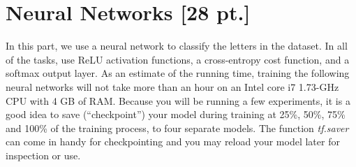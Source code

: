 \documentclass[12pt,letterpaper]{article}
\begin{document}
\section{Neural Networks [28 pt.]}

In this part, we use a neural network to classify the letters in the dataset. In all of the tasks, use ReLU activation functions, a cross-entropy cost function, and a softmax output layer. As an estimate of the running time, training the following neural networks will not take more than an hour on an Intel core i7 1.73-GHz CPU with 4 GB of RAM. Because you will be running a few experiments, it is a good idea to save (``checkpoint'') your model during training at 25\%, 50\%, 75\% and 100\% of the training process, to four separate models. The function \textit{tf.saver} can come in handy for checkpointing and you may reload your model later for inspection or use.
\end{document}
